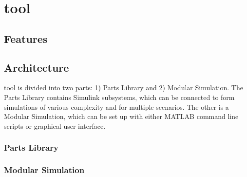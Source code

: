 \section{\acf{tool}}\label{sec:toolbox}

\subsection{Features}


\subsection{Architecture}
    \ac{tool} is divided into two parts: 1) Parts Library and 2) Modular Simulation. The Parts Library contains Simulink subsystems, which can be connected to form simulations of various complexity and for multiple scenarios. The other is a Modular Simulation, which can be set up with either MATLAB command line scripts or graphical user interface.

    \subsubsection{Parts Library}

    \subsubsection{Modular Simulation}